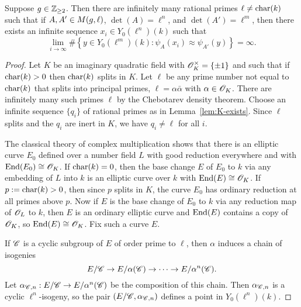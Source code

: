\documentclass{amsart}
\begin{document}
\begin{proposition}\label{prop:lim-degree}
Suppose $g\in\mathbb{Z}_{\ge 2}$. %
  Then there are infinitely many rational primes $\ell\neq\operatorname{char}(k)$ such that if
   $A,A' \in M(g,\ell)$, $\det(A) = \ell^n$, and $\det(A') = \ell^m$,
  then there exists an infinite sequence $x_i \in Y_0(\ell^n)(k)$ such that
  \[
    \lim_{i \to \infty}\#\left\{ y \in Y_0(\ell^m)(k) \colon \psi_A(x_i) \approx \psi_{A'}(y) \right\} = \infty.
  \]
\end{proposition}
\begin{proof}
  Let $K$ be an imaginary quadratic field %
with $\mathscr{O}_K^\times = \{\pm 1\}$ and such that if $\operatorname{char}(k) > 0$ then $\operatorname{char}(k)$ splits in $K$.
Let $\ell$ be any prime number not equal to $\operatorname{char}(k)$ that splits into principal primes, $\ell = \alpha{\bar \alpha}$ with $ \alpha\in \mathscr{O}_K$.
There are infinitely many such primes $\ell$ by the Chebotarev density theorem.
Choose an infinite sequence $\{q_i\}$ of rational primes as in Lemma~\ref{lem:K-exists}. Since $\ell$ splits and the $q_i$ are
inert in $K$, we have $q_i\ne \ell$ for all $i$. %

  The classical theory of complex multiplication shows that there is an elliptic curve $E_0$ defined over a number field $L$ with good reduction everywhere and with $\operatorname{End}(E_0) \cong \mathscr{O}_K$.
  If $\operatorname{char}(k) = 0$, then the base change $E$ of $E_0$ to $k$ via any embedding of $L$ into $k$ is an elliptic curve over $k$ with $\operatorname{End}(E) \cong \mathscr{O}_K$.
  If $p:= \operatorname{char}(k) > 0$, then since $p$ splits in $K$, the curve $E_0$ has ordinary reduction at all primes above $p$.
  Now if $E$ is the base change of $E_0$ to $k$ via any reduction map of $\mathscr{O}_L$ to $k$, then $E$ is an ordinary elliptic curve and $\operatorname{End}(E)$ contains a copy of $\mathscr{O}_K$, so $\operatorname{End}(E) \cong \mathscr{O}_K$.
  Fix such a curve $E$.

  If $\mathscr{C}$ is a cyclic subgroup of $E$ of order prime to $\ell$, then $\alpha$ induces a chain of isogenies
  \[
    E/\mathscr{C} \to E/\alpha(\mathscr{C}) \to \cdots \to E/\alpha^n(\mathscr{C}).
  \]
  Let $\alpha_{\mathscr{C},n}: E/\mathscr{C} \to E/\alpha^n(\mathscr{C})$ be the composition of this chain. Then $\alpha_{\mathscr{C},n}$ is a cyclic $\ell^n$-isogeny, so the pair $(E/\mathscr{C},\alpha_{\mathscr{C},n})$ defines a point in $Y_0(\ell^n)(k)$.


\end{proof}
\end{document}
